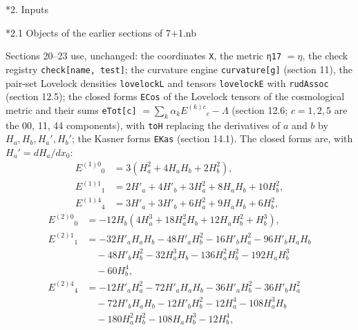\documentclass[10pt,a4paper]{article}
\makeatletter
\renewcommand\section{\@startsection{section}{1}{\z@}{-3.5ex \@plus -1ex \@minus -.2ex}{2.3ex \@plus.2ex}{\normalfont\Large\bfseries\raggedright}}
\renewcommand\subsection{\@startsection{subsection}{2}{\z@}{-3.25ex\@plus -1ex \@minus -.2ex}{1.5ex \@plus .2ex}{\normalfont\large\bfseries\raggedright}}
\makeatother
\begin{document}
\section*{2. Inputs}
\subsection*{2.1 Objects of the earlier sections of 7+1.nb}
Sections 20–23 use, unchanged: the coordinates \texttt{X}, the metric \texttt{η17} $=\eta$, the check registry \texttt{check[name, test]}; the curvature engine \texttt{curvature[g]} (section 11), the pair-set Lovelock densities \texttt{lovelockL} and tensors \texttt{lovelockE} with \texttt{rudAssoc} (section 12.5); the closed forms \texttt{ECos} of the Lovelock tensors of the cosmological metric and their sums \texttt{eTot[c]} $=\sum_k\alpha_kE^{(k)c}{}_c-\Lambda$ (section 12.6; $c=1,2,5$ are the 00, 11, 44 components), with \texttt{toH} replacing the derivatives of $a$ and $b$ by $H_a,H_b,H_a',H_b'$; the Kasner forms \texttt{EKas} (section 14.1). The closed forms are, with $H_a'=dH_a/dx_0$:
\begin{align*}
E^{(1)0}{}_0&=3 \left(H_{a}^{2} + 4 H_{a} H_{b} + 2 H_{b}^{2}\right), \\
E^{(1)1}{}_1&=2 H'_{a} + 4 H'_{b} + 3 H_{a}^{2} + 8 H_{a} H_{b} + 10 H_{b}^{2}, \\
E^{(1)4}{}_4&=3 H'_{a} + 3 H'_{b} + 6 H_{a}^{2} + 9 H_{a} H_{b} + 6 H_{b}^{2},
\end{align*}
\begin{align*}
E^{(2)0}{}_0&=- 12 H_{b} \left(4 H_{a}^{3} + 18 H_{a}^{2} H_{b} + 12 H_{a} H_{b}^{2} + H_{b}^{3}\right), \\
E^{(2)1}{}_1&=- 32 H'_{a} H_{a} H_{b} - 48 H'_{a} H_{b}^{2} - 16 H'_{b} H_{a}^{2} - 96 H'_{b} H_{a} H_{b} \\
&\quad - 48 H'_{b} H_{b}^{2} - 32 H_{a}^{3} H_{b} - 136 H_{a}^{2} H_{b}^{2} - 192 H_{a} H_{b}^{3} \\
&\quad - 60 H_{b}^{4}, \\
E^{(2)4}{}_4&=- 12 H'_{a} H_{a}^{2} - 72 H'_{a} H_{a} H_{b} - 36 H'_{a} H_{b}^{2} - 36 H'_{b} H_{a}^{2} \\
&\quad - 72 H'_{b} H_{a} H_{b} - 12 H'_{b} H_{b}^{2} - 12 H_{a}^{4} - 108 H_{a}^{3} H_{b} \\
&\quad - 180 H_{a}^{2} H_{b}^{2} - 108 H_{a} H_{b}^{3} - 12 H_{b}^{4},
\end{align*}
\end{document}

